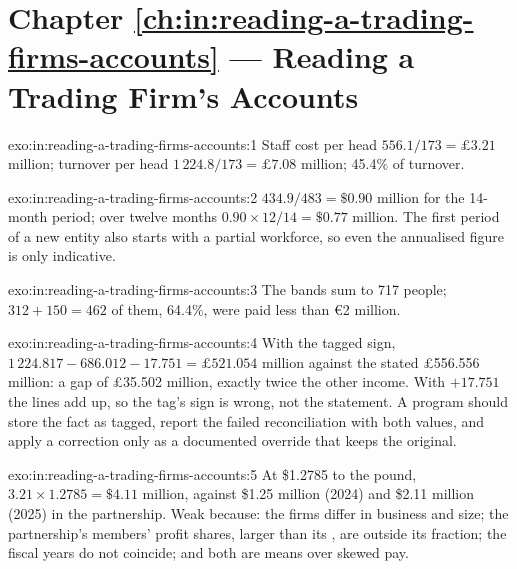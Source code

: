 \section*{Chapter \ref{ch:in:reading-a-trading-firms-accounts} --- Reading a Trading Firm's Accounts}

\begin{solution}{exo:in:reading-a-trading-firms-accounts:1}
Staff cost per head $556.1/173=\pounds3.21$ million; turnover per head $1\,224.8/173=\pounds7.08$ million; 
45.4\% of turnover.
\end{solution}

\begin{solution}{exo:in:reading-a-trading-firms-accounts:2}
$434.9/483=\$0.90$ million for the 14-month period; over twelve months $0.90\times12/14=\$0.77$ million. The first period
of a new entity also starts with a partial workforce, so even the annualised figure is only indicative.
\end{solution}

\begin{solution}{exo:in:reading-a-trading-firms-accounts:3}
The bands sum to 717 people; $312+150=462$ of them, 64.4\%, were paid less than \euro2 million.
\end{solution}

\begin{solution}{exo:in:reading-a-trading-firms-accounts:4}
With the tagged sign, $1\,224.817-686.012-17.751=\pounds521.054$ million against the stated \pounds556.556 million: a gap
of \pounds35.502 million, exactly twice the other income. With $+17.751$ the lines add up, so the tag's sign is wrong,
not the statement. A program should store the fact as tagged, report the failed reconciliation with both values, and
apply a correction only as a documented override that keeps the original.
\end{solution}

\begin{solution}{exo:in:reading-a-trading-firms-accounts:5}
At \$1.2785 to the pound, $3.21\times1.2785=\$4.11$ million, against \$1.25 million (2024) and \$2.11 million (2025) in
the partnership. Weak because: the firms differ in business and size; the partnership's members' profit shares, larger
than its , are outside its fraction; the fiscal years do not coincide; and both are means over skewed pay.
\end{solution}

